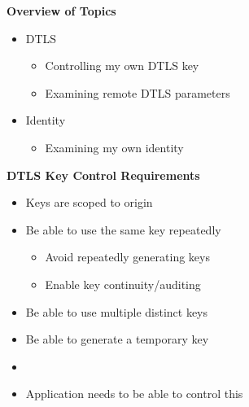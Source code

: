 \documentclass[helvetica]{seminar}
\newcommand{\heading}[1]{%
  \begin{center} 
    \large\bf 
    #1 
  \end{center} 
  \vspace{.4 in}}
\begin{document}
\begin{slide}
\begin{center}
\vspace{1 in}
\vspace{.2in}
\large{{Identity, Security, etc. API Issues}} \\
\vspace{3em}
\begin{tabular}{c}
Eric Rescorla \\
\url{ekr@rtfm.com}
\end{tabular}
}
\end{center}

\end{slide}


\centerslidesfalse 


\begin{slide}
\heading{Overview of Topics}

\begin{itemize}
\item DTLS
\begin{itemize}
  \item Controlling my own DTLS key
  \item Examining remote DTLS parameters
\end{itemize}

\item Identity
  \begin{itemize}
  \item Examining my own identity
  \end{itemize}
\end{itemize}
\end{slide}


\begin{slide}
\heading{DTLS Key Control Requirements}

\begin{itemize}
\item Keys are scoped to origin
\item Be able to use the same key repeatedly
  \begin{itemize}
  \item Avoid repeatedly generating keys
  \item Enable key continuity/auditing
  \end{itemize}

\item Be able to use multiple distinct keys
\item Be able to generate a temporary key
\item[]
\item Application needs to be able to control this
\end{itemize}
\end{slide}
\end{document}
